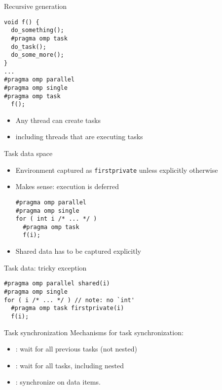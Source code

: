 \begin{numberedframe}{Recursive generation}
\begin{lstlisting}
void f() {
  do_something();
  #pragma omp task
  do_task();
  do_some_more();
}
...
#pragma omp parallel
#pragma omp single
#pragma omp task
  f();
\end{lstlisting}
  \begin{itemize}
  \item Any thread can create tasks
  \item including threads that are executing tasks
  \end{itemize}
\end{numberedframe}

\begin{exerciseframe}[taskfactor]
  
\end{exerciseframe}

\begin{numberedframe}{Task data space}
  \begin{itemize}
  \item Environment captured as \lstinline{firstprivate}
    unless explicitly otherwise
  \item Makes sense: execution is deferred
\begin{lstlisting}
#pragma omp parallel
#pragma omp single
for ( int i /* ... */ )
  #pragma omp task
  f(i);
\end{lstlisting}
  \item Shared data has to be captured explicitly
  \end{itemize}
\end{numberedframe}

\begin{numberedframe}{Task data: tricky exception}
\begin{lstlisting}
#pragma omp parallel shared(i)
#pragma omp single
for ( i /* ... */ ) // note: no `int'
  #pragma omp task firstprivate(i)
  f(i);
\end{lstlisting}
\end{numberedframe}

\begin{numberedframe}{Task synchronization}
  Mechanisms for task synchronization:
  \begin{itemize}
  \item {}: wait for all previous tasks (not nested)
  \item {}: wait for all tasks, including nested
  \item {}: synchronize on data items.
  \end{itemize}
\end{numberedframe}

